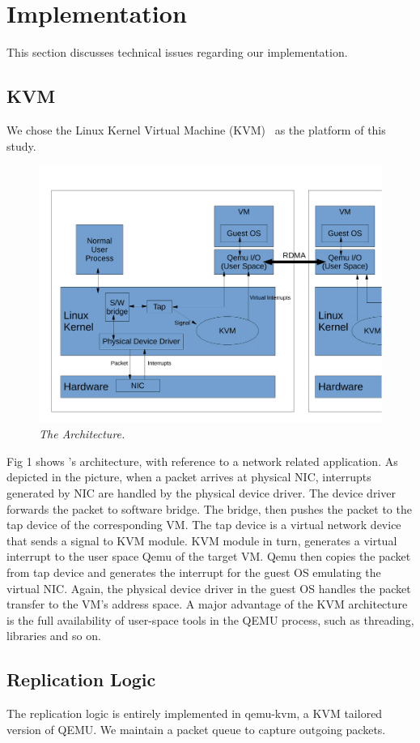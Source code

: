  \section{Implementation} \label{sec:impl}

This section discusses technical issues regarding our implementation.

\subsection{KVM}\label{sec:kvm}
We chose the Linux Kernel Virtual Machine (KVM)~\cite{kivity2007kvm} 
as the platform of this study.

\begin{figure}[t]
\centering
\includegraphics[width=.47\textwidth]{figures/arch}
\vspace{-.2in}
\caption{{\em The \xxx Architecture.}} \label{fig:arc}
\vspace{.05in}
\end{figure}

Fig 1 shows \xxx's architecture, with reference to a network related 
application. As depicted in the picture, when a packet arrives at physical NIC, 
interrupts generated by NIC are handled by the physical device driver. The device 
driver forwards the packet to software bridge. The bridge, then pushes the packet 
to the tap device of the corresponding VM. The tap device is a virtual network 
device that sends a signal to KVM module. KVM module in turn, generates a virtual 
interrupt to the user space Qemu of the target VM. Qemu then copies the packet from 
tap device and generates the interrupt for the guest OS emulating the virtual NIC. 
Again, the physical device driver in the guest OS handles the packet transfer to 
the VM’s address space. A major advantage of the KVM architecture is the full 
availability of user-space tools in the QEMU process, such as threading, libraries 
and so on.
\subsection{Replication Logic}\label{sec:Replication}
The replication logic is entirely implemented in qemu-kvm, a KVM tailored version of QEMU.
We maintain a packet queue to capture outgoing packets.
